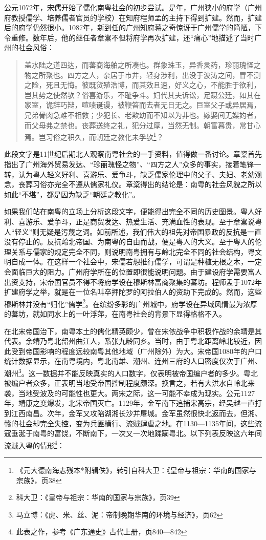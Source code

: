 公元1072年，宋儒开始了儒化南粤社会的初步尝试。是年，广州狭小的府学（广州府教授儒学、培养儒者官员的学校）在知府程师孟的主持下得到扩建。然而，扩建后的府学仍然很小。1087年，新到任的广州知府蒋之奇惊讶于广州儒学的简陋，下令重修。数年后，他的继任者章楶不但将府学再次扩建，还“痛心”地描述了当时广州的社会风俗：

\begin{quote}

盖水陆之道四达，而蕃商海舶之所凑也。群象珠玉，异香灵药，珍丽瑰怪之物之所聚也。四方之人，杂居于市井，轻身涉利，出没于波涛之间，冒不测之险，死且无悔。彼既货殖浩博，而其效且速，好义之心，不能胜于欲利，岂其势之使然欤？俗喜游乐，不耻争斗。妇代其夫诉讼，足蹑公廷，如其在家室，诡辞巧辩，喧啧诞谩，被鞭笞而去者无日无之。巨室父子或异居焉，兄弟骨肉急难不相救；少犯长、老欺幼而不知以为非也。嫁娶间无媒妁者，而父母弗之禁也。丧葬送终之礼，犯分过厚，当然无制。朝富暮贵，常甘心焉。岂习俗之积久，而朝廷之教化未孚欤\footnote{《元大德南海志残本*附辑佚》，转引自科大卫：《皇帝与祖宗：华南的国家与宗族》，页38}？

\end{quote}

此段文字是11世纪后期北人观察南粤社会的一手资料，值得做一番讨论。章楶首先指出了广州海外贸易发达、“珍丽瑰怪之物”、“四方之人”众多的事实，接着笔锋一转，认为粤人轻义好利、喜游乐、爱争斗，缺乏儒家伦理中的父子、夫妇、老幼观念，丧葬习俗亦完全不遵从儒家礼仪。章楶得出的结论是：南粤的社会风貌之所以如此“不堪”，都是因为缺乏“朝廷之教化”。

如果我们站在南粤的立场上分析这段文字，便能得出完全不同的历史图景。粤人好利、喜游乐、爱争斗，正是商贸发达、热爱生活、充满血性的表现。至于章楶说粤人“轻义”则无疑是污蔑之词。如前所述，我们伟大的祖先对帝国暴政的反抗是一直没有停止的。反抗岭北帝国、为南粤的自由而战，便是粤人的大义。至于粤人的伦理关系与儒家的规定完全不同，则说明南粤拥有与岭北完全不同的社会结构，粤文明自成一体。在这样一个社会中，宋儒若想推行儒学，可谓是种植无根之木，一定会面临巨大的阻力。广州府学所在的位置即很能说明问题。由于建设府学需要富人出资支持，宋帝国官员不得不将府学设在穆斯林富商聚集的蕃坊。程师孟于1072年扩建府学之举，就是在一位名叫卒押陀罗的阿拉伯人的资助下完成的。然而，这些穆斯林并没有“归化”儒学\footnote{科大卫：《皇帝与祖宗：华南的国家与宗族》，页39}。在缤纷多彩的广州城中，府学设在异域风情最为浓厚的蕃坊，就如同水上的一叶浮萍，在南粤社会的背景下显得格格不入。

在北宋帝国治下，南粤本土的儒化精英颇少，曾在宋侬战争中积极作战的余靖是其代表。余靖乃粤北韶州曲江人，系张九龄同乡。当时，由于粤北距离岭北较近，因此受到帝国影响的程度远较南粤其他地域（广州除外）为大。宋帝国1080年的户口统计数据显示，在南粤境内，粤北南雄、潮州、连州三府的人口密度仅次于广州、潮州\footnote{马立博：《虎、米、丝、泥：帝制晚期华南的环境与经济》，页62}。这一数据并不能反映真实的人口数字，仅表明被帝国编户者的多少。粤北被编户者众多，正表明当地受帝国控制程度颇深。换言之，若有大洪水自岭北来袭，当地受波及的可能性也更大。两宋之际，这一可能不幸成为现实。公元1127年，靖康之变爆发，北宋帝国灭亡。1129年，金军南下追捕宋高宗，经吴越一直打到江西南昌。次年，金军又攻陷湖湘长沙并屠城。金军虽然很快北返而去，但湘、赣的社会却完全失控，变为兵匪横行、流贼肆虐之地。在1130—1135年间，这些流寇垂涎于南粤的富饶，不断南下，一次又一次地蹂躏粤北。以下列表反映这六年间流贼入粤的情形\footnote{此表之作，参考《广东通史》古代上册，页840—842}：

